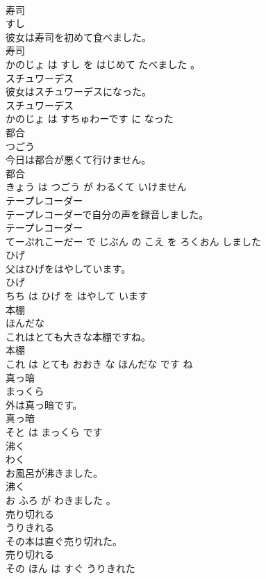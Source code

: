 \documentclass[8pt]{extreport}
\begin{document}
\begin{CJK}{UTF8}{min}
\\	寿司	
\\	すし			
\\	彼女は寿司を初めて食べました。	
\\	寿司 
\\	かのじょ は すし を はじめて たべました 。			
\\	スチュワーデス	
\\	彼女はスチュワーデスになった。	
\\	スチュワーデス 
\\	かのじょ は すちゅわーです に なった			
\\	都合	
\\	つごう			
\\	今日は都合が悪くて行けません。	
\\	都合 
\\	きょう は つごう が わるくて いけません			
\\	テープレコーダー	
\\	テープレコーダーで自分の声を録音しました。	
\\	テープレコーダー 
\\	てーぷれこーだー で じぶん の こえ を ろくおん しました			
\\	ひげ	
\\	父はひげをはやしています。	
\\	ひげ 
\\	ちち は ひげ を はやして います			
\\	本棚	
\\	ほんだな			
\\	これはとても大きな本棚ですね。	
\\	本棚 
\\	これ は とても おおき な ほんだな です ね			
\\	真っ暗	
\\	まっくら			
\\	外は真っ暗です。	
\\	真っ暗 
\\	そと は まっくら です			
\\	沸く	
\\	わく			
\\	お風呂が沸きました。	
\\	沸く 
\\	お ふろ が わきました 。			
\\	売り切れる	
\\	うりきれる			
\\	その本は直ぐ売り切れた。	
\\	売り切れる 
\\	その ほん は すぐ うりきれた			

\end{CJK}
\end{document}
